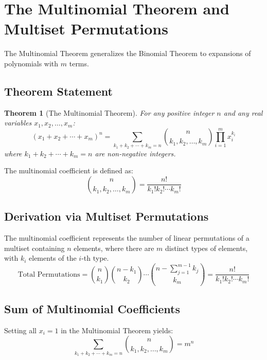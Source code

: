 \documentclass[10pt,journal,compsoc,onecolumn]{IEEEtran}
\newtheorem{theorem}{Theorem}
\begin{document}
\section{The Multinomial Theorem and Multiset Permutations}
\label{sec:multinomial}

The Multinomial Theorem generalizes the Binomial Theorem to expansions of polynomials with $m$ terms.

\subsection{Theorem Statement}

\begin{theorem}[The Multinomial Theorem]
For any positive integer $n$ and any real variables $x_1, x_2, \ldots, x_m$:
\begin{equation}
(x_1 + x_2 + \cdots + x_m)^n = \sum_{k_1+k_2+\cdots+k_m=n} \binom{n}{k_1, k_2, \ldots, k_m} \prod_{i=1}^{m} x_i^{k_i}
\end{equation}
where $k_1 + k_2 + \cdots + k_m = n$ are non-negative integers.
\end{theorem}

The multinomial coefficient is defined as:
\begin{equation}
\binom{n}{k_1, k_2, \ldots, k_m} = \frac{n!}{k_1! k_2! \cdots k_m!}
\end{equation}

\subsection{Derivation via Multiset Permutations}

The multinomial coefficient represents the number of linear permutations of a multiset containing $n$ elements, where there are $m$ distinct types of elements, with $k_i$ elements of the $i$-th type.
\begin{equation}
\text{Total Permutations} = \binom{n}{k_1} \binom{n - k_1}{k_2} \cdots \binom{n - \sum_{j=1}^{m-1} k_j}{k_m} = \frac{n!}{k_1! k_2! \cdots k_m!}
\end{equation}

\subsection{Sum of Multinomial Coefficients}

Setting all $x_i = 1$ in the Multinomial Theorem yields:
\begin{equation}
\sum_{k_1+k_2+\cdots+k_m=n} \binom{n}{k_1, k_2, \ldots, k_m} = m^n
\end{equation}
\end{document}
